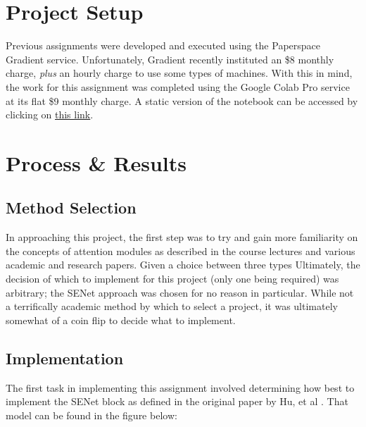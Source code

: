 \documentclass{article}
\begin{document}
  
  \graphicspath{{./images/}}

\section{Project Setup}
\par Previous assignments were developed and executed using the Paperspace Gradient service.
Unfortunately, Gradient recently instituted an \$8 monthly charge, \textit{plus} an hourly charge to use some types of machines.
With this in mind, the work for this assignment was completed using the Google Colab Pro service at its flat \$9 monthly charge.
A static version of the notebook can be accessed by clicking on \href{https://colab.research.google.com/drive/1pp5azAPubxAZP9u5DPgnywmt1fpxQWaU}{this link}.


\section{Process \& Results}
\subsection{Method Selection}
In approaching this project, the first step was to try and gain more familiarity on the concepts of attention modules as described in the course lectures and various academic and research papers.
Given a choice between three types 
Ultimately, the decision of which to implement for this project (only one being required) was arbitrary; the SENet approach was chosen for no reason in particular.
While not a terrifically academic method by which to select a project, it was ultimately somewhat of a coin flip to decide what to implement.

\subsection{Implementation} \label{impl}
\par The first task in implementing this assignment involved determining how best to implement the SENet block as defined in the original paper by Hu, et al \cite{Hu2020Squeeze-and-ExcitationNetworks}.
That model can be found in the figure below:
\end{document}
